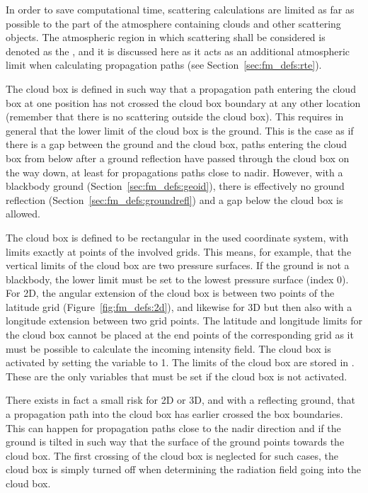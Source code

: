 \label{sec:fm_defs:cloudbox}

In order to save computational time, scattering calculations are
limited as far as possible to the part of the atmosphere containing
clouds and other scattering objects. The atmospheric region in which
scattering shall be considered is denoted as the ,
and it is discussed here as it acts as an additional atmospheric limit
when calculating propagation paths (see
Section~\ref{sec:fm_defs:rte}).

The cloud box is defined in such way that a propagation path entering
the cloud box at one position has not crossed the cloud box boundary
at any other location (remember that there is no scattering outside
the cloud box). This requires in general that the lower limit of the
cloud box is the ground. This is the case as if there is a gap between
the ground and the cloud box, paths entering the cloud box from below
after a ground reflection have passed through the cloud box on the way
down, at least for propagations paths close to nadir. However, with a
blackbody ground (Section~\ref{sec:fm_defs:geoid}), there is
effectively no ground reflection
(Section~\ref{sec:fm_defs:groundrefl}) and a gap below the cloud box
is allowed.

The cloud box is defined to be rectangular in the used coordinate
system, with limits exactly at points of the involved grids. This
means, for example, that the vertical limits of the cloud box are two
pressure surfaces. If the ground is not a blackbody, the lower limit
must be set to the lowest pressure surface (index 0). For 2D, the
angular extension of the cloud box is between two points of the
latitude grid (Figure~\ref{fig:fm_defs:2d}), and likewise for 3D but
then also with a longitude extension between two grid points.  The
latitude and longitude limits for the cloud box cannot be placed at
the end points of the corresponding grid as it must be possible to
calculate the incoming intensity field. The cloud box is activated by
setting the variable  to 1. The limits of the
cloud box are stored in . These are the only
variables that must be set if the cloud box is not activated.

There exists in fact a small risk for 2D or 3D, and with a reflecting
ground, that a propagation path into the cloud box has earlier crossed
the box boundaries. This can happen for propagation paths close to the
nadir direction and if the ground is tilted in such way that the
surface of the ground points towards the cloud box. The first crossing
of the cloud box is neglected for such cases, the cloud box is simply
turned off when determining the radiation field going into the cloud
box.


